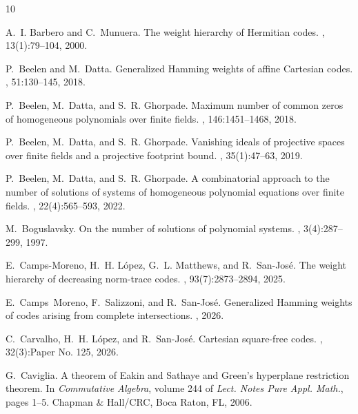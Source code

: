 \documentclass[11pt]{amsart}
\theoremstyle{definition}
\numberwithin{equation}{section}
\begin{document}
\begin{thebibliography}{10}

A.~I. Barbero and C.~Munuera.
\newblock The weight hierarchy of {H}ermitian codes.
, 13(1):79--104, 2000.

P.~Beelen and M.~Datta.
\newblock Generalized {H}amming weights of affine {C}artesian codes.
, 51:130--145, 2018.

P.~Beelen, M.~Datta, and S.~R. Ghorpade.
\newblock Maximum number of common zeros of homogeneous polynomials over finite fields.
, 146:1451--1468, 2018.

P.~Beelen, M.~Datta, and S.~R. Ghorpade.
\newblock Vanishing ideals of projective spaces over finite fields and a projective footprint bound.
, 35(1):47--63, 2019.

P.~Beelen, M.~Datta, and S.~R. Ghorpade.
\newblock A combinatorial approach to the number of solutions of systems of homogeneous polynomial equations over finite fields.
, 22(4):565--593, 2022.

M.~Boguslavsky.
\newblock On the number of solutions of polynomial systems.
, 3(4):287--299, 1997.

E.~Camps-Moreno, H.~H. L\'opez, G.~L. Matthews, and R.~San-Jos\'e.
\newblock The weight hierarchy of decreasing norm-trace codes.
, 93(7):2873--2894, 2025.

E.~Camps~Moreno, F.~Salizzoni, and R.~San-José.
\newblock Generalized {H}amming weights of codes arising from complete intersections.
, 2026.

C.~Carvalho, H.~H. L\'opez, and R.~San-Jos\'e.
\newblock Cartesian square-free codes.
, 32(3):Paper No. 125, 2026.

G.~Caviglia.
\newblock A theorem of {Eakin} and {Sathaye} and {Green}'s hyperplane restriction theorem.
\newblock In {\em Commutative Algebra}, volume 244 of {\em Lect. Notes Pure Appl. Math.}, pages 1--5. Chapman \& Hall/CRC, Boca Raton, FL, 2006.


\end{thebibliography}
\end{document}
